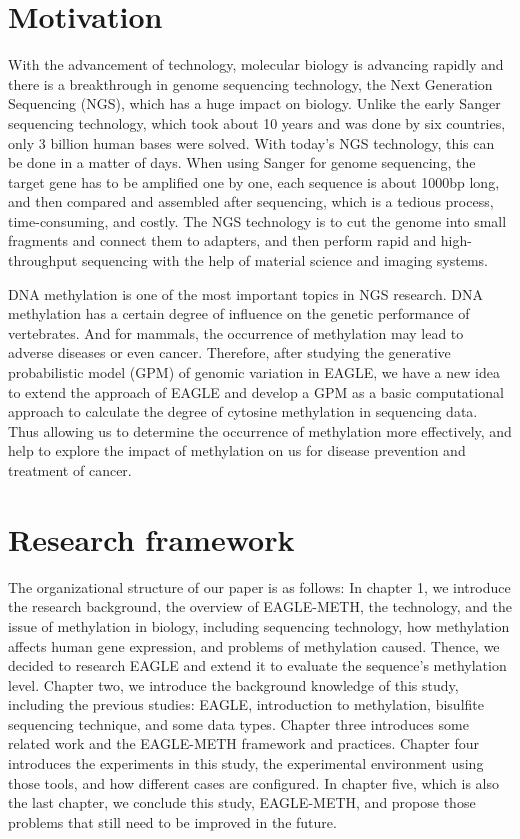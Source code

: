 \documentclass{PHlab-thesis}
\begin{document}
\section{Motivation}
\par With the advancement of technology, molecular biology is advancing rapidly and there is a breakthrough in genome sequencing technology, the Next Generation Sequencing (NGS), which has a huge impact on biology. Unlike the early Sanger sequencing technology, which took about 10 years and was done by six countries, only 3 billion human bases were solved. With today's NGS technology, this can be done in a matter of days. When using Sanger for genome sequencing, the target gene has to be amplified one by one, each sequence is about 1000bp long, and then compared and assembled after sequencing, which is a tedious process, time-consuming, and costly. The NGS technology is to cut the genome into small fragments and connect them to adapters, and then perform rapid and high-throughput sequencing with the help of material science and imaging systems. 
\par DNA methylation is one of the most important topics in NGS research. DNA methylation has a certain degree of influence on the genetic performance of vertebrates. And for mammals, the occurrence of methylation may lead to adverse diseases or even cancer. Therefore, after studying the generative probabilistic model (GPM) of genomic variation in EAGLE, we have a new idea to extend the approach of EAGLE and develop a GPM as a basic computational approach to calculate the degree of cytosine methylation in sequencing data. Thus allowing us to determine the occurrence of methylation more effectively, and help to explore the impact of methylation on us for disease prevention and treatment of cancer.

\section{Research framework}
\par The organizational structure of our paper is as follows: In chapter 1, we introduce the research background, the overview of EAGLE-METH, the technology, and the issue of methylation in biology, including sequencing technology, how methylation affects human gene expression, and problems of methylation caused. Thence, we decided to research EAGLE and extend it to evaluate the sequence's methylation level. Chapter two, we introduce the background knowledge of this study, including the previous studies: EAGLE, introduction to methylation, bisulfite sequencing technique, and some data types. Chapter three introduces some related work and the EAGLE-METH framework and practices. Chapter four introduces the experiments in this study, the experimental environment using those tools, and how different cases are configured. In chapter five, which is also the last chapter, we conclude this study, EAGLE-METH, and propose those problems that still need to be improved in the future.
\end{document}
